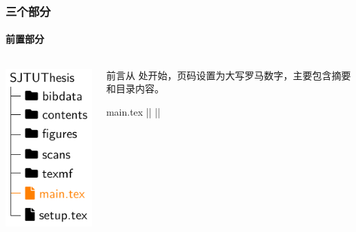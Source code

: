 \begin{frame}[fragile]
  \frametitle{三个部分}
  \framesubtitle{前置部分}
  \begin{columns}
    \begin{column}{0.4\textwidth}
      \includegraphics[page=7]{support/figures/thesisdir.pdf}
    \end{column}
    \begin{column}{0.6\textwidth}
      前言从  处开始，页码设置为大写罗马数字，主要包含摘要和目录内容。
      \begin{codeblock}[firstnumber=27]{main.tex}
|\highlightline|%
|\highlightline|\frontmatter



\tableofcontents
      \end{codeblock}
    \end{column}
  \end{columns}
\end{frame}

